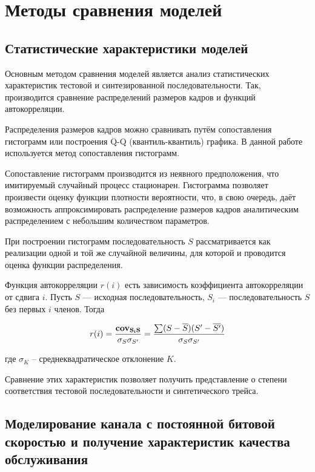 \section{Методы сравнения моделей}

\subsection{Статистические характеристики моделей}
\label{sse:statsmethods}

Основным методом сравнения моделей является анализ
статистических характеристик тестовой и синтезированной
последовательности. Так, производится сравнение распределений
размеров кадров и функций автокорреляции.

Распределения размеров кадров можно сравнивать путём сопоставления
гистограмм или построения Q-Q (квантиль-квантиль) графика. В данной
работе используется метод сопоставления гистограмм.

Сопоставление гистограмм производится из неявного
предположения, что имитируемый случайный процесс
стационарен. Гистограмма позволяет произвести
оценку функции плотности вероятности, что,
в свою очередь, даёт возможность аппроксимировать
распределение размеров кадров аналитическим
распределением с небольшим количеством параметров.

При построении гистограмм последовательность $S$ рассматривается
как реализации одной и той же случайной величины,
для которой и проводится оценка функции распределения.

Функция автокорреляции $r(i)$ есть зависимость коэффициента
автокорреляции от сдвига $i$. Пусть $S$ --- исходная последовательность,
$S_i$ --- последовательность $S$ без первых $i$ членов. Тогда

\begin{equation}
    r(i) = \frac{\bf{cov}_{S_i S}}{\sigma_S \sigma_{S'}}
         = \frac{\sum (S - \overline{S})(S' - \overline{S'})}{\sigma_S \sigma_{S'}}
\end{equation}

где $\sigma_K$ -- среднеквадратическое отклонение $K$.

Сравнение этих характеристик позволяет получить представление о
степени соответствия тестовой последовательности и
синтетического трейса.

\newpage
\subsection{Моделирование канала с постоянной битовой
скоростью и получение характеристик качества
обслуживания}
\label{sec:modelcomp}

